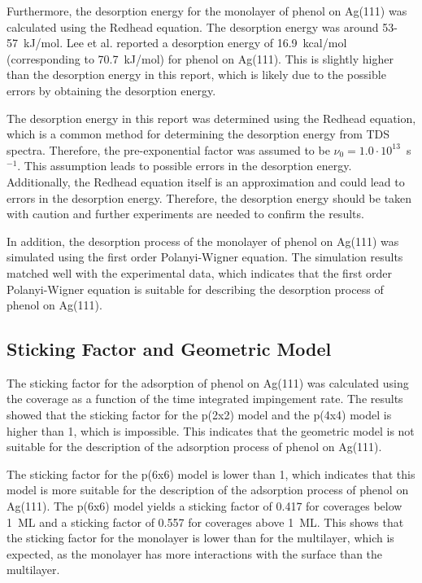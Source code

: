 \documentclass[fontsize=11pt,reqno,a4paper,oneside]{scrartcl}
\begin{document}
Furthermore, the desorption energy for the monolayer of phenol on Ag(111) was calculated using the Redhead equation.\autocite{Redhead1962} The desorption energy was around 53-57~kJ/mol. Lee et al.\autocite{Lee2001} reported a desorption energy of 16.9~kcal/mol (corresponding to 70.7~kJ/mol) for phenol on Ag(111). This is slightly higher than the desorption energy in this report, which is likely due to the possible errors by obtaining the desorption energy.

The desorption energy in this report was determined using the Redhead equation\autocite{Redhead1962}, which is a common method for determining the desorption energy from \ac{TDS} spectra. Therefore, the pre-exponential factor was assumed to be $\nu_0 = 1.0 \cdot 10^{13}$~s$^{-1}$. This assumption leads to possible errors in the desorption energy. Additionally, the Redhead equation itself is an approximation and could lead to errors in the desorption energy. Therefore, the desorption energy should be taken with caution and further experiments are needed to confirm the results.

In addition, the desorption process of the monolayer of phenol on Ag(111) was simulated using the first order Polanyi-Wigner equation. The simulation results matched well with the experimental data, which indicates that the first order Polanyi-Wigner equation is suitable for describing the desorption process of phenol on Ag(111).


\subsection{Sticking Factor and Geometric Model}

The sticking factor for the adsorption of phenol on Ag(111) was calculated using the coverage as a function of the time integrated impingement rate. The results showed that the sticking factor for the p(2x2) model and the p(4x4) model is higher than 1, which is impossible. This indicates that the geometric model is not suitable for the description of the adsorption process of phenol on Ag(111).

The sticking factor for the p(6x6) model is lower than 1, which indicates that this model is more suitable for the description of the adsorption process of phenol on Ag(111). The p(6x6) model yields a sticking factor of 0.417 for coverages below 1~ML and a sticking factor of 0.557 for coverages above 1~ML. This shows that the sticking factor for the monolayer is lower than for the multilayer, which is expected, as the monolayer has more interactions with the surface than the multilayer.
\end{document}
